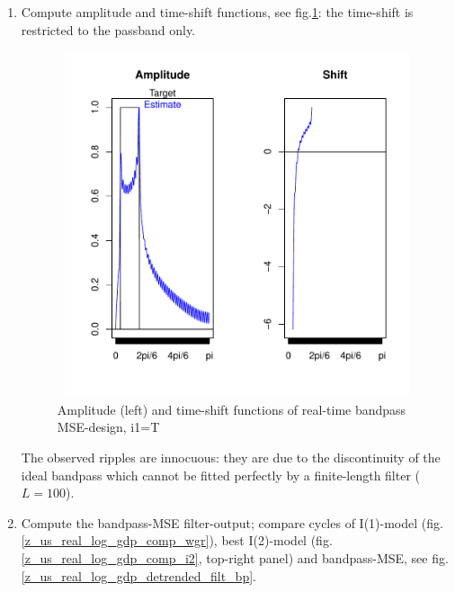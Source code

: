 \documentclass[a4paper]{book}
\begin{document}
\begin{enumerate}
\item Compute amplitude and time-shift functions, see fig.\ref{z_us_real_log_gdp_detrended_amp_shift_bp}: the time-shift is restricted to the passband only.
\begin{figure}[H]\begin{center}\includegraphics[height=4in, width=6in]{z_us_real_log_gdp_detrended_amp_shift_bp}\caption{Amplitude (left) and time-shift functions of real-time bandpass MSE-design, i1=T\label{z_us_real_log_gdp_detrended_amp_shift_bp}}\end{center}\end{figure}The observed ripples are innocuous: they are due to the discontinuity of the ideal bandpass which cannot be fitted perfectly by a finite-length filter ($L=100$).  
\item Compute the bandpass-MSE filter-output; compare cycles of I(1)-model (fig.\ref{z_us_real_log_gdp_comp_wgr}), best I(2)-model (fig.\ref{z_us_real_log_gdp_comp_i2}, top-right panel) and bandpass-MSE, see fig.\ref{z_us_real_log_gdp_detrended_filt_bp}.

\begin{Schunk}
\end{Schunk}



\end{enumerate}
\end{document}
